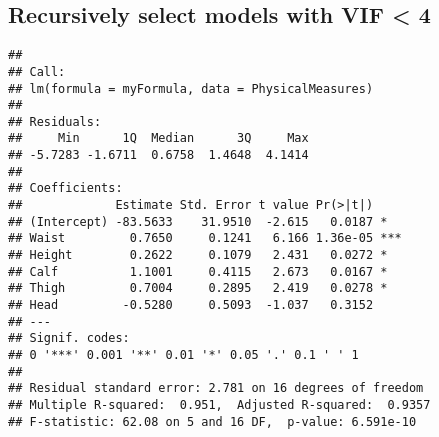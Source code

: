 \documentclass[]{article}
\newenvironment{Shaded}{\begin{snugshade}}{\end{snugshade}}
\newcommand{\KeywordTok}[1]{\textcolor[rgb]{0.13,0.29,0.53}{\textbf{#1}}}
\newcommand{\DataTypeTok}[1]{\textcolor[rgb]{0.13,0.29,0.53}{#1}}
\newcommand{\DecValTok}[1]{\textcolor[rgb]{0.00,0.00,0.81}{#1}}
\newcommand{\StringTok}[1]{\textcolor[rgb]{0.31,0.60,0.02}{#1}}
\newcommand{\CommentTok}[1]{\textcolor[rgb]{0.56,0.35,0.01}{\textit{#1}}}
\newcommand{\ControlFlowTok}[1]{\textcolor[rgb]{0.13,0.29,0.53}{\textbf{#1}}}
\newcommand{\OperatorTok}[1]{\textcolor[rgb]{0.81,0.36,0.00}{\textbf{#1}}}
\newcommand{\NormalTok}[1]{#1}
\begin{document}
\begin{Shaded}
\end{Shaded}

\subsection{Recursively select models with VIF \textless{}
4}\label{recursively-select-models-with-vif-4-1}

\begin{verbatim}
## 
## Call:
## lm(formula = myFormula, data = PhysicalMeasures)
## 
## Residuals:
##     Min      1Q  Median      3Q     Max 
## -5.7283 -1.6711  0.6758  1.4648  4.1414 
## 
## Coefficients:
##             Estimate Std. Error t value Pr(>|t|)    
## (Intercept) -83.5633    31.9510  -2.615   0.0187 *  
## Waist         0.7650     0.1241   6.166 1.36e-05 ***
## Height        0.2622     0.1079   2.431   0.0272 *  
## Calf          1.1001     0.4115   2.673   0.0167 *  
## Thigh         0.7004     0.2895   2.419   0.0278 *  
## Head         -0.5280     0.5093  -1.037   0.3152    
## ---
## Signif. codes:  
## 0 '***' 0.001 '**' 0.01 '*' 0.05 '.' 0.1 ' ' 1
## 
## Residual standard error: 2.781 on 16 degrees of freedom
## Multiple R-squared:  0.951,  Adjusted R-squared:  0.9357 
## F-statistic: 62.08 on 5 and 16 DF,  p-value: 6.591e-10
\end{verbatim}
\end{document}
